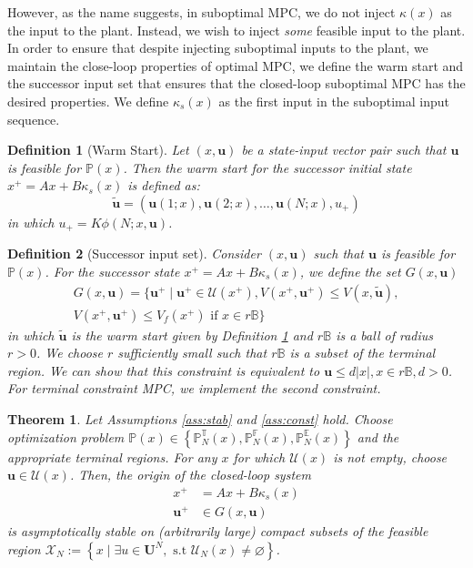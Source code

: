 \documentclass[10pt, twocolumn]{article}
\newcommand{\bu}{\mathbf{u}}
\newcommand{\norm}[1]{\vert #1 \vert}
\newcommand{\set}[1]{\left\lbrace #1 \right\rbrace}
\newtheorem{definition}{Definition}
\newtheorem{theorem}{Theorem}
\theoremstyle{definition}
\begin{document}
However, as the name suggests, in suboptimal MPC, we do not inject $\kappa(x)$ as the input to the plant. Instead, we wish to inject {\emph{some}} feasible input to the plant. In order to ensure that despite injecting suboptimal inputs to the plant, we maintain the close-loop properties of optimal MPC, we define the warm start and the successor input set that ensures that the closed-loop suboptimal MPC has the desired properties. We define $\kappa_s(x)$ as the first input in the suboptimal input sequence.
\begin{definition}[Warm Start]
\label{def:warmstart}
Let $(x,\bu)$ be a state-input vector pair such that $\bu$ is feasible for $\mathbb{P}(x)$. Then the warm start for the successor initial state
$x^+ = Ax+B\kappa_s(x)$ is defined as:
\begin{equation*}
\tilde{\bu} = \left (\bu(1;x),\bu(2;x),\ldots,\bu(N;x),u_+\right)
\end{equation*}
in which  $u_+ = K\phi(N;x,\bu)$.
\end{definition}
\begin{definition}[Successor input set]
\label{def:G}
Consider $(x,\bu)$ such that $\bu$ is feasible for $\mathbb{P}(x)$. For the  successor state
$x^+ = Ax+B\kappa_s(x)$, we define the set $G(x,\bu)$
\begin{multline*}
G(x,\bu) = \lbrace \bu^+ \mid \bu^+ \in
\mathcal{U}(x^+), V(x^+,\bu^+)\leq V(x,\tilde{\bu}), \\
V(x^+,\bu^+) \leq V_f(x^+) \text{~if~} x\in r\mathbb{B} \rbrace
\end{multline*}
in which $\tilde{\bu}$ is the warm start given by Definition 
\ref{def:warmstart} and $r\mathbb{B}$ is a ball of radius $r>0$. We choose $r$ sufficiently small such that $r\mathbb{B}$ is a subset of the terminal region. We can show that this constraint is equivalent to  $\bu \leq d \norm{x}, x \in r\mathbb{B},d >0$. For terminal constraint MPC, we implement the second constraint.  
\end{definition}
\begin{theorem}
\label{thm:suboptimal}
Let Assumptions \ref{ass:stab} and \ref{ass:const}
hold. Choose optimization problem $\mathbb{P}(x) \in \set{
  \mathbb{P}_N^{\mathbb{T}}(x), \mathbb{P}_N^{\mathbb{F}}(x),
  \mathbb{P}_N^{\mathbb{E}}(x)}$ and the appropriate terminal
regions. For any $x$ for which  $\mathcal{U}(x)$  is not empty, choose $\bu \in \mathcal{U}(x)$. Then, the origin of the closed-loop system
\begin{align*}
x^+ &= Ax+ B\kappa_s(x) \\
\bu^+ &\in G(x,\bu)
\end{align*}
is asymptotically stable on (arbitrarily large) compact  subsets of
the feasible region $\mathcal{X}_N :=\set{x\mid \exists u \in
  \mathbf{U}^N, \text{~s.t~} \mathcal{U}_N(x) \neq \varnothing}$. 
\end{theorem}
\end{document}
